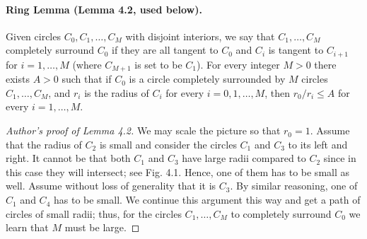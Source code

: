 \paragraph{Ring Lemma (Lemma 4.2, used below).}
Given circles $C_0,C_1,\ldots,C_M$ with disjoint interiors, we say that $C_1,\ldots,C_M$ completely surround $C_0$ if they are all tangent to $C_0$ and $C_i$ is tangent to $C_{i+1}$ for $i=1,\ldots,M$ (where $C_{M+1}$ is set to be $C_1$).
For every integer $M>0$ there exists $A>0$ such that if $C_0$ is a circle completely surrounded by $M$ circles $C_1,\ldots,C_M$, and $r_i$ is the radius of $C_i$ for every $i=0,1,\ldots,M$, then $r_0/r_i\le A$ for every $i=1,\ldots,M$.
\begin{proof}[Author's proof of Lemma 4.2]
We may scale the picture so that $r_0=1$. Assume that the radius of $C_2$ is small and consider the circles $C_1$ and $C_3$ to its left and right. It cannot be that both $C_1$ and $C_3$ have large radii compared to $C_2$ since in this case they will intersect; see Fig. 4.1. Hence, one of them has to be small as well. Assume without loss of generality that it is $C_3$. By similar reasoning, one of $C_1$ and $C_4$ has to be small. We continue this argument this way and get a path of circles of small radii; thus, for the circles $C_1,\ldots,C_M$ to completely surround $C_0$ we learn that $M$ must be large.
\end{proof}

